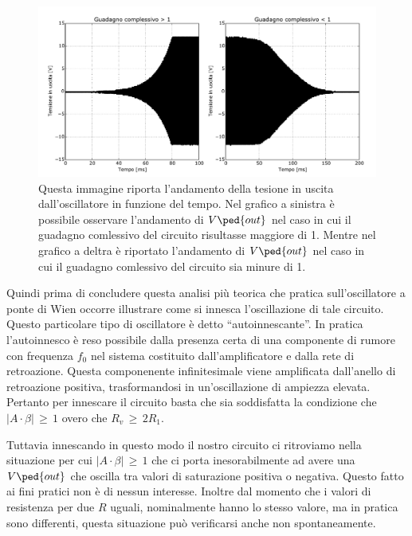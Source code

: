 \begin{figure}[h]
    \includegraphics[height=0.35\textheight]{figure/exp_imp.pdf}
    \caption{Questa immagine riporta l'andamento della tesione in uscita dall'oscillatore in funzione del tempo. Nel grafico a sinistra è possibile osservare l'andamento di $V\ped{out}$ nel caso in cui il guadagno comlessivo del circuito risultasse maggiore di 1. Mentre nel grafico a deltra è riportato l'andamento di $V\ped{out}$ nel caso in cui il guadagno comlessivo del circuito sia minure di 1.}
    \label{fig:wien_instable}
\end{figure}

Quindi prima di concludere questa analisi più teorica che pratica sull'oscillatore a ponte di Wien occorre illustrare come si innesca l'oscillazione di tale circuito. Questo particolare tipo di oscillatore è detto ``autoinnescante''. In pratica l'autoinnesco è reso possibile dalla presenza certa di una componente di rumore con frequenza $f_0$ nel sistema costituito dall'amplificatore e dalla rete di retroazione. Questa componenente infinitesimale viene amplificata dall'anello di retroazione positiva, trasformandosi in un'oscillazione di ampiezza elevata. Pertanto per innescare il circuito basta che sia soddisfatta la condizione che $\left|A \cdot \beta \right|\, \geq \,1$ overo che $R_v\, \geq \,2R_1$.

Tuttavia innescando in questo modo il nostro circuito ci ritroviamo nella situazione per cui $\left|A \cdot \beta \right|\, \geq \,1$ che ci porta inesorabilmente ad avere una $V\ped{out}$ che oscilla tra valori di saturazione positiva o negativa. Questo fatto ai fini pratici non è di nessun interesse. Inoltre dal momento che i valori di resistenza per due $R$ uguali, nominalmente hanno lo stesso valore, ma in pratica sono differenti, questa situazione può verificarsi anche non spontaneamente.

